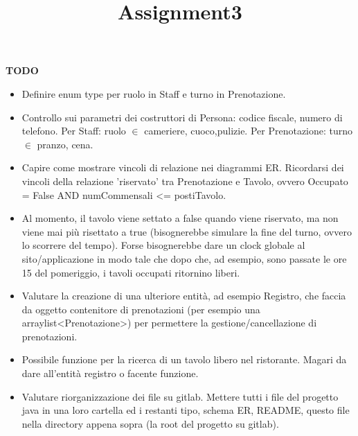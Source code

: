 \documentclass{article}
\title{Assignment3}
\date{}
\begin{document}
\maketitle


\begin{center}
        \textbf{TODO}
\end{center}


\begin{itemize}
    \item Definire enum type per ruolo in Staff e turno in Prenotazione.
    \item Controllo sui parametri dei costruttori di Persona: codice fiscale, numero di telefono. Per Staff: ruolo $\in$ {cameriere, cuoco,pulizie}. Per Prenotazione: turno $\in$ {pranzo, cena}.

    \item Capire come mostrare vincoli di relazione nei diagrammi ER.
          Ricordarsi dei vincoli della relazione 'riservato' tra Prenotazione e Tavolo, ovvero Occupato = False AND numCommensali <= postiTavolo.

    \item Al momento, il tavolo viene settato a false quando viene         riservato, ma non viene mai più risettato a true                 (bisognerebbe simulare la fine del turno, ovvero lo              scorrere del tempo). Forse bisognerebbe dare un clock 
          globale al sito/applicazione in modo tale che dopo che, ad esempio, sono passate le ore 15 del pomeriggio, i tavoli occupati ritornino liberi.
 
    \item Valutare la creazione di una ulteriore entità, ad esempio Registro, che faccia da oggetto contenitore di prenotazioni (per esempio una arraylist<Prenotazione>) per permettere la gestione/cancellazione di prenotazioni.

    \item Possibile funzione per la ricerca di un tavolo libero nel ristorante. Magari da dare all'entità registro o facente funzione.
    
    \item Valutare riorganizzazione dei file su gitlab. Mettere tutti i file del progetto java in una loro cartella ed i restanti tipo, schema ER, README, questo file nella directory appena sopra (la root del progetto su gitlab).
\end{itemize}
\end{document}
